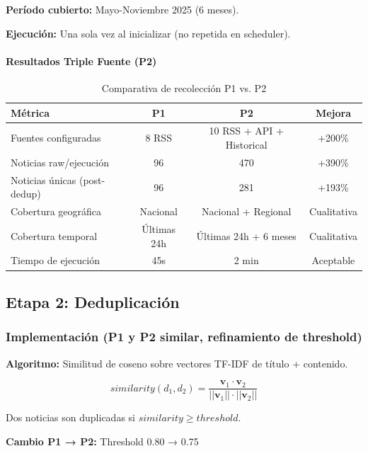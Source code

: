 \textbf{Período cubierto:} Mayo-Noviembre 2025 (6 meses).

\textbf{Ejecución:} Una sola vez al inicializar (no repetida en scheduler).

\paragraph{Resultados Triple Fuente (P2)}

\begin{table}[h]
\centering
\caption{Comparativa de recolección P1 vs. P2}
\begin{tabular}{|l|c|c|c|}
\hline
\textbf{Métrica} & \textbf{P1} & \textbf{P2} & \textbf{Mejora} \\ \hline
Fuentes configuradas & 8 RSS & 10 RSS + API + Historical & +200\% \\ \hline
Noticias raw/ejecución & 96 & 470 & +390\% \\ \hline
Noticias únicas (post-dedup) & 96 & 281 & +193\% \\ \hline
Cobertura geográfica & Nacional & Nacional + Regional & Cualitativa \\ \hline
Cobertura temporal & Últimas 24h & Últimas 24h + 6 meses & Cualitativa \\ \hline
Tiempo de ejecución & 45s & 2 min & Aceptable \\ \hline
\end{tabular}
\end{table}

\subsection{Etapa 2: Deduplicación}
\label{subsec:impl_deduplicacion}

\subsubsection{Implementación (P1 y P2 similar, refinamiento de threshold)}

\textbf{Algoritmo:} Similitud de coseno sobre vectores TF-IDF de título + contenido.

\begin{equation}
similarity(d_1, d_2) = \frac{\mathbf{v}_1 \cdot \mathbf{v}_2}{||\mathbf{v}_1|| \cdot ||\mathbf{v}_2||}
\end{equation}

Dos noticias son duplicadas si $similarity \geq threshold$.

\textbf{Cambio P1 → P2:} Threshold 0.80 → 0.75

